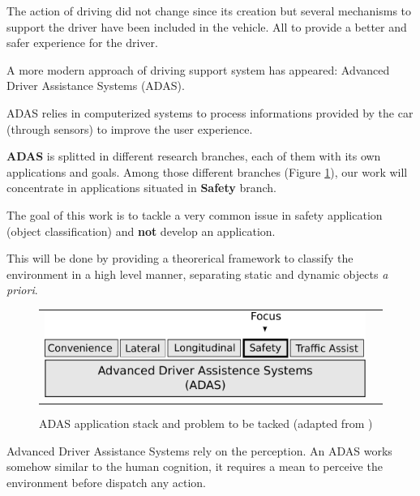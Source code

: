 
The action of driving did not change since its creation but several mechanisms to support the driver have been included in the vehicle. All to provide a better and safer experience for the driver\cite{riener2010sensor}.

A more modern approach of driving support system has appeared: Advanced Driver Assistance Systems (ADAS). 

ADAS relies in computerized systems to process informations provided by the car (through sensors) to improve the user experience. 

\textbf{ADAS} is splitted in different research branches, each of them with its own applications and goals. Among those different branches (Figure \ref{fig:sensor:target}), our work will concentrate in applications situated in \textbf{Safety} branch. 

The goal of this work is to tackle a very common issue in safety application (object classification) and \textbf{not} develop an application.

This will be done by providing a theorerical framework to classify the environment in a high level manner, separating static and dynamic objects \textit{a priori}.

\begin{figure}[h]
\centering
	\begin{tabular}{lr}\\
		\includegraphics[scale=0.7]{img/fig:sensor:target} 
	\end{tabular}
	\caption{ADAS application stack and problem to be tacked (adapted from \cite{riener2010sensor})}
	\label{fig:sensor:target}
\end{figure}

Advanced Driver Assistance Systems rely on the perception. An ADAS works somehow similar to the human cognition, it requires a mean to perceive the environment before dispatch any action. 

